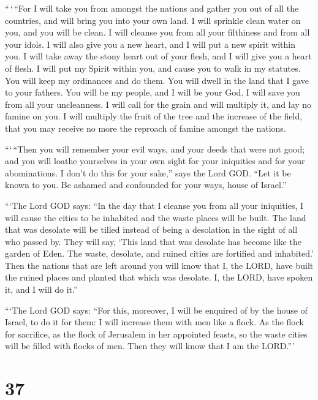  ``\,`\,``For I will take you from amongst the nations and
gather you out of all the countries, and will bring you into your own
land.  I will sprinkle clean water on you, and you will be
clean. I will cleanse you from all your filthiness and from all your
idols.  I will also give you a new heart, and I will put a
new spirit within you. I will take away the stony heart out of your
flesh, and I will give you a heart of flesh.  I will put my
Spirit within you, and cause you to walk in my statutes. You will keep
my ordinances and do them.  You will dwell in the land that
I gave to your fathers. You will be my people, and I will be your God.
 I will save you from all your uncleanness. I will call for
the grain and will multiply it, and lay no famine on you. 
I will multiply the fruit of the tree and the increase of the field,
that you may receive no more the reproach of famine amongst the nations.

 ```\,``Then you will remember your evil ways, and your
deeds that were not good; and you will loathe yourselves in your own
sight for your iniquities and for your abominations.  I
don't do this for your sake,'' says the Lord GOD. ``Let it be known to
you. Be ashamed and confounded for your ways, house of Israel.''

 ```The Lord GOD says: ``In the day that I cleanse you from
all your iniquities, I will cause the cities to be inhabited and the
waste places will be built.  The land that was desolate
will be tilled instead of being a desolation in the sight of all who
passed by.  They will say, `This land that was desolate has
become like the garden of Eden. The waste, desolate, and ruined cities
are fortified and inhabited.'  Then the nations that are
left around you will know that I, the LORD, have built the ruined places
and planted that which was desolate. I, the LORD, have spoken it, and I
will do it.''

 ```The Lord GOD says: ``For this, moreover, I will be
enquired of by the house of Israel, to do it for them: I will increase
them with men like a flock.  As the flock for sacrifice, as
the flock of Jerusalem in her appointed feasts, so the waste cities will
be filled with flocks of men. Then they will know that I am the LORD.'''

\hypertarget{section-35}{%
\section{37}\label{section-35}}

